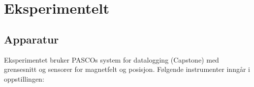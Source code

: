 \documentclass[../Elmag-labhefte-2020.tex]{subfiles}
\begin{document}
\section{Eksperimentelt \label{ch.magnetfelt.eksperimentelt}}

\subsection{Apparatur}

Eksperimentet bruker PASCOs system for datalogging (Capstone) med grensesnitt og sensorer for magnetfelt og posisjon.
Følgende instrumenter inngår i oppstillingen:
\vspace{-4mm} 
\end{document}
